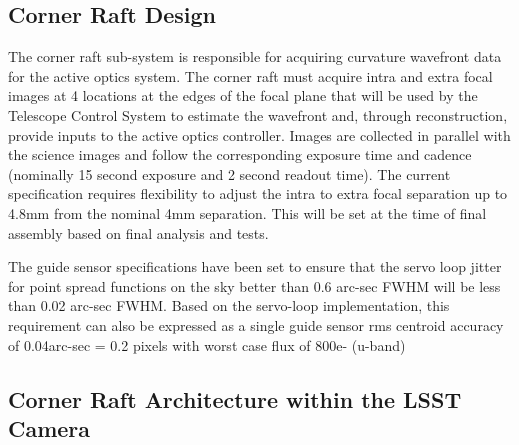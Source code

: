 \subsection{Corner Raft Design}

The corner raft sub-system is responsible for acquiring curvature wavefront data for the active optics
system. The corner raft must acquire intra and extra focal images at 4 locations at the edges of the focal
plane that will be used by the Telescope Control System to estimate the wavefront and, through
reconstruction, provide inputs to the active optics controller. Images are collected in parallel with the
science images and follow the corresponding exposure time and cadence (nominally 15 second exposure
and 2 second readout time). The current specification requires flexibility to adjust the intra to extra focal
separation up to 4.8mm from the nominal 4mm separation. This will be set at the time of final assembly
based on final analysis and tests.

The guide sensor specifications have been set to ensure that the servo loop jitter for point spread
functions on the sky better than 0.6 arc-sec FWHM will be less than 0.02 arc-sec FWHM. Based on the
servo-loop implementation, this requirement can also be expressed as a single guide sensor rms
centroid accuracy of 0.04arc-sec = 0.2 pixels with worst case flux of 800e- (u-band)


\subsection{Corner Raft Architecture within the LSST Camera}

